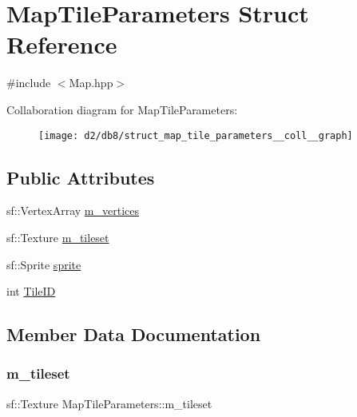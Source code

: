 \hypertarget{struct_map_tile_parameters}{}\section{Map\+Tile\+Parameters Struct Reference}
\label{struct_map_tile_parameters}


{\ttfamily \#include $<$Map.\+hpp$>$}



Collaboration diagram for Map\+Tile\+Parameters\+:\nopagebreak
\begin{figure}[H]
\begin{center}
\leavevmode
\texttt{[image: d2/db8/struct\_map\_tile\_parameters\_\_coll\_\_graph]}
\end{center}
\end{figure}
\subsection*{Public Attributes}
\begin{DoxyCompactItemize}
\item 
sf\+::\+Vertex\+Array \mbox{\hyperlink{struct_map_tile_parameters_a37a456acd1110b590bc254bb3d193d11}{m\+\_\+vertices}}
\item 
sf\+::\+Texture \mbox{\hyperlink{struct_map_tile_parameters_a86da4b22484cbccb7e2620c333326574}{m\+\_\+tileset}}
\item 
sf\+::\+Sprite \mbox{\hyperlink{struct_map_tile_parameters_a9a36e686aa0e4a3d3fa5f299b8667b0d}{sprite}}
\item 
int \mbox{\hyperlink{struct_map_tile_parameters_ac660182507cc13ce6c421b37b5dd4039}{Tile\+ID}}
\end{DoxyCompactItemize}


\subsection{Member Data Documentation}
\mbox{\label{struct_map_tile_parameters_a86da4b22484cbccb7e2620c333326574}} 
\subsubsection{\texorpdfstring{m\+\_\+tileset}{m\_tileset}}
{\footnotesize\ttfamily sf\+::\+Texture Map\+Tile\+Parameters\+::m\+\_\+tileset}

